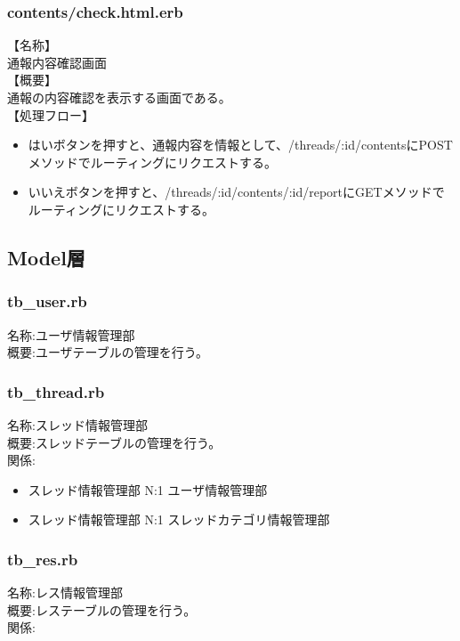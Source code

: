\documentclass[a4j]{jarticle}
\begin{document}
\subsubsection{contents/check.html.erb}
\noindent
【名称】\\
通報内容確認画面\\
【概要】\\
通報の内容確認を表示する画面である。\\
【処理フロー】
\begin{itemize}
  \item はいボタンを押すと、通報内容を情報として、/threads/:id/contentsにPOSTメソッドでルーティングにリクエストする。
  \item いいえボタンを押すと、/threads/:id/contents/:id/reportにGETメソッドでルーティングにリクエストする。
\end{itemize}

\subsection{Model層}
  
\subsubsection{tb\_user.rb}
  \noindent 
  名称:ユーザ情報管理部\\
  概要:ユーザテーブルの管理を行う。\\

\subsubsection{tb\_thread.rb}
  \noindent 
  名称:スレッド情報管理部\\
  概要:スレッドテーブルの管理を行う。\\
  関係:  
  \begin{itemize}
  \item スレッド情報管理部 N:1 ユーザ情報管理部
  \item スレッド情報管理部 N:1 スレッドカテゴリ情報管理部 
  \end{itemize}

\subsubsection{tb\_res.rb}
  \noindent 
  名称:レス情報管理部\\
  概要:レステーブルの管理を行う。\\
  関係:
  
\end{document}
